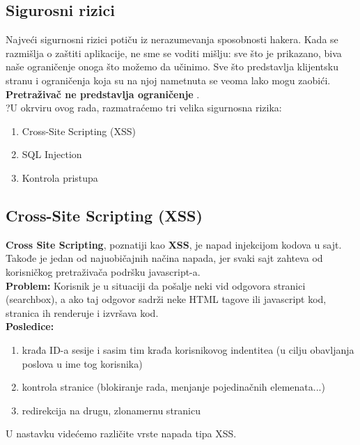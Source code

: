 \documentclass[a4paper]{article}
\begin{document}
\subsection{Sigurosni rizici}
Najve\'{c}i sigurnosni rizici poti\v{c}u iz nerazumevanja sposobnosti hakera. Kada se razmi\v{s}lja o za\v{s}titi aplikacije, ne sme se voditi mi\v{s}lju: sve \v{s}to je prikazano, biva na\v{s}e ograni\v{c}enje onoga \v{s}to mo\v{z}emo da u\v{c}inimo. Sve \v{s}to predstavlja klijentsku stranu i ograni\v{c}enja koja su na njoj nametnuta se veoma lako mogu zaobi\'{c}i.
\textbf{Pretra\v{z}iva\v{c} ne predstavlja ograni\v{c}enje }.\\
?U okrviru ovog rada, razmatra\'{c}emo tri velika sigurnosna rizika:
\begin{enumerate}
	\item Cross-Site Scripting (XSS)
	\item SQL Injection
	\item Kontrola pristupa
\end{enumerate}
\newpage
\subsection{Cross-Site Scripting (XSS)}
\textbf{Cross Site Scripting}, poznatiji kao \textbf{XSS}, je napad injekcijom kodova u sajt. Takođe je jedan od najuobi\v{c}ajnih na\v{c}ina napada, jer svaki sajt zahteva od korisni\v{c}kog pretra\v{z}iva\v{c}a podr\v{s}ku javascript-a.\\
\textbf{Problem:} Korisnik je u situaciji da po\v{s}alje neki vid odgovora stranici (searchbox), a ako taj odgovor sadr\v{z}i neke HTML tagove ili javascript kod, stranica ih renderuje i izvr\v{s}ava kod.\\
\textbf{Posledice:} \begin{enumerate}
	\item krađa ID-a sesije i sasim tim krađa korisnikovog indentitea (u cilju obavljanja poslova u ime tog korisnika)
	\item kontrola stranice (blokiranje rada, menjanje pojedina\v{c}nih elemenata...)
	\item redirekcija na drugu, zlonamernu stranicu
\end{enumerate}
U nastavku vide\'{c}emo razli\v{c}ite vrste napada tipa XSS.
\end{document}

